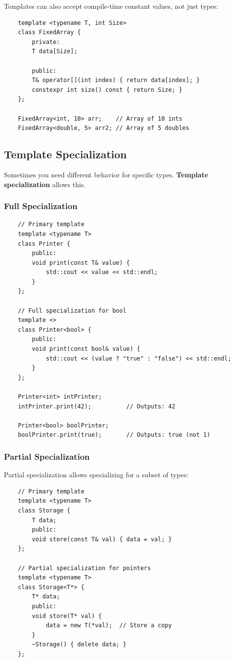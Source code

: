 Templates can also accept compile-time constant values, not just types:

\begin{lstlisting}
	template <typename T, int Size>
	class FixedArray {
		private:
		T data[Size];
		
		public:
		T& operator[](int index) { return data[index]; }
		constexpr int size() const { return Size; }
	};
	
	FixedArray<int, 10> arr;    // Array of 10 ints
	FixedArray<double, 5> arr2; // Array of 5 doubles
\end{lstlisting}

\subsection{Template Specialization}

Sometimes you need different behavior for specific types. \textbf{Template specialization} allows this.

\subsubsection{Full Specialization}

\begin{lstlisting}
	// Primary template
	template <typename T>
	class Printer {
		public:
		void print(const T& value) {
			std::cout << value << std::endl;
		}
	};
	
	// Full specialization for bool
	template <>
	class Printer<bool> {
		public:
		void print(const bool& value) {
			std::cout << (value ? "true" : "false") << std::endl;
		}
	};
	
	Printer<int> intPrinter;
	intPrinter.print(42);          // Outputs: 42
	
	Printer<bool> boolPrinter;
	boolPrinter.print(true);       // Outputs: true (not 1)
\end{lstlisting}

\subsubsection{Partial Specialization}

Partial specialization allows specializing for a subset of types:

\begin{lstlisting}
	// Primary template
	template <typename T>
	class Storage {
		T data;
		public:
		void store(const T& val) { data = val; }
	};
	
	// Partial specialization for pointers
	template <typename T>
	class Storage<T*> {
		T* data;
		public:
		void store(T* val) { 
			data = new T(*val);  // Store a copy
		}
		~Storage() { delete data; }
	};
\end{lstlisting}

